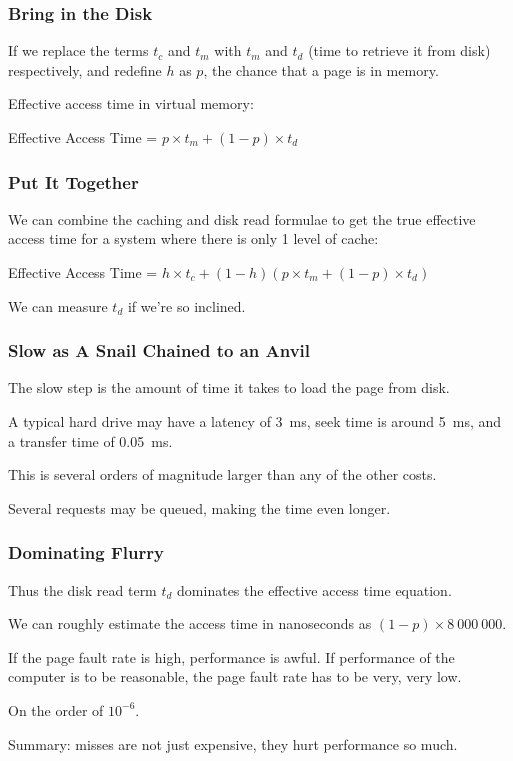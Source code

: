 \begin{frame}
\frametitle{Bring in the Disk}

If we replace the terms $t_{c}$ and $t_{m}$ with $t_{m}$ and $t_{d}$ (time to retrieve it from disk) respectively, and redefine $h$ as $p$, the chance that a page is in memory.

Effective access time in virtual memory: 

\begin{center}
	Effective Access Time = $ p \times t_{m} + (1 - p) \times t_{d}$
\end{center}


\end{frame}



\begin{frame}
\frametitle{Put It Together}

We can combine the caching and disk read formulae to get the true effective access time for a system where there is only 1 level of cache:

\begin{center}
	Effective Access Time = $ h \times t_{c} + (1 - h) ( p \times t_{m} + (1 - p) \times t_{d})$
\end{center}

We can measure $t_{d}$ if we're so inclined.

\end{frame}



\begin{frame}
\frametitle{Slow as A Snail Chained to an Anvil}

The slow step is the amount of time it takes to load the page from disk. 

A typical hard drive may have a latency of 3~ms, seek time is around 5~ms, and a transfer time of 0.05~ms. 

This is  several orders of magnitude larger than any of the other costs.

Several requests may be queued, making the time even longer.

\end{frame}



\begin{frame}
\frametitle{Dominating Flurry}


Thus the disk read term $t_{d}$ dominates the effective access time equation. 

We can roughly estimate the access time in nanoseconds as $(1-p) \times 8~000~000$. 

If the page fault rate is high, performance is awful. If performance of the computer is to be reasonable, the page fault rate has to be very, very low. 

On the order of $10^{-6}$. 

Summary: misses are not just expensive, they hurt performance so much.

\end{frame}




